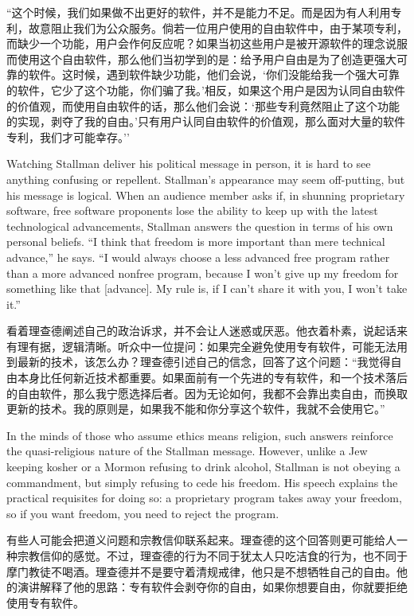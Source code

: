 \ifdefined\chs
``这个时候，我们如果做不出更好的软件，并不是能力不足。而是因为有人利用专利，故意阻止我们为公众服务。倘若一位用户使用的自由软件中，由于某项专利，而缺少一个功能，用户会作何反应呢？如果当初这些用户是被开源软件的理念说服而使用这个自由软件，那么他们当初学到的是：给予用户自由是为了创造更强大可靠的软件。这时候，遇到软件缺少功能，他们会说，`你们没能给我一个强大可靠的软件，它少了这个功能，你们骗了我。'相反，如果这个用户是因为认同自由软件的价值观，而使用自由软件的话，那么他们会说：`那些专利竟然阻止了这个功能的实现，剥夺了我的自由。'只有用户认同自由软件的价值观，那么面对大量的软件专利，我们才可能幸存。''
\fi

\ifdefined\eng
Watching Stallman deliver his political message in person, it is hard to see anything confusing or repellent. Stallman's appearance may seem off-putting, but his message is logical. When an audience member asks if, in shunning proprietary software, free software proponents lose the ability to keep up with the latest technological advancements, Stallman answers the question in terms of his own personal beliefs. ``I think that freedom is more important than mere technical advance,'' he says. ``I would always choose a less advanced free program rather than a more advanced nonfree program, because I won't give up my freedom for something like that [advance]. My rule is, if I can't share it with you, I won't take it.''
\fi

\ifdefined\chs
看着理查德阐述自己的政治诉求，并不会让人迷惑或厌恶。他衣着朴素，说起话来有理有据，逻辑清晰。听众中一位提问：如果完全避免使用专有软件，可能无法用到最新的技术，该怎么办？理查德引述自己的信念，回答了这个问题：``我觉得自由本身比任何新近技术都重要。如果面前有一个先进的专有软件，和一个技术落后的自由软件，那么我宁愿选择后者。因为无论如何，我都不会靠出卖自由，而换取更新的技术。我的原则是，如果我不能和你分享这个软件，我就不会使用它。''
\fi

\ifdefined\eng
In the minds of those who assume ethics means religion, such answers reinforce the quasi-religious nature of the Stallman message. However, unlike a Jew keeping kosher or a Mormon refusing to drink alcohol, Stallman is not obeying a commandment, but simply refusing to cede his freedom.  His speech explains the practical requisites for doing so: a proprietary program takes away your freedom, so if you want freedom, you need to reject the program.
\fi

\ifdefined\chs
有些人可能会把道义问题和宗教信仰联系起来。理查德的这个回答则更可能给人一种宗教信仰的感觉。不过，理查德的行为不同于犹太人只吃洁食的行为，也不同于摩门教徒不喝酒。理查德并不是要守着清规戒律，他只是不想牺牲自己的自由。他的演讲解释了他的思路：专有软件会剥夺你的自由，如果你想要自由，你就要拒绝使用专有软件。
\fi


